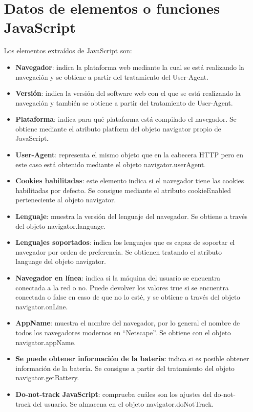 \section{Datos de elementos o funciones JavaScript}
Los elementos extraídos de JavaScript son:
\begin{itemize}
    \item \textbf{Navegador}: indica la plataforma web mediante la cual se está realizando la navegación y se obtiene a partir del tratamiento del User-Agent.
    \item \textbf{Versión}: indica la versión del software web con el que se está realizando la navegación y también se obtiene a partir del tratamiento de User-Agent.
    \item \textbf{Plataforma}: indica para qué plataforma está compilado el navegador. Se obtiene mediante el atributo platform del objeto navigator propio de JavaScript.
    \item \textbf{User-Agent}: representa el mismo objeto que en la cabecera HTTP pero en este caso está obtenido mediante el objeto navigator.userAgent.
    \item \textbf{Cookies habilitadas}: este elemento indica si el navegador tiene las cookies habilitadas por defecto. Se consigue mediante el atributo cookieEnabled perteneciente al objeto navigator.
    \item \textbf{Lenguaje}: muestra la versión del lenguaje del navegador. Se obtiene a través del objeto navigator.language. 
    \item \textbf{Lenguajes soportados}: indica los lenguajes que es capaz de soportar el navegador por orden de preferencia. Se obtienen tratando el atributo language del objeto navigator. 
    \item \textbf{Navegador en línea}: indica si la máquina del usuario se encuentra conectada a la red o no. Puede devolver los valores true si se encuentra conectada o false en caso de que no lo esté, y se obtiene a través del objeto navigator.onLine.
    \item \textbf{AppName}: muestra el nombre del navegador, por lo general el nombre de todos los navegadores modernos en “Netscape”. Se obtiene con el objeto navigator.appName.
    \item \textbf{Se puede obtener información de la batería}: indica si es posible obtener información de la batería. Se consigue a partir del tratamiento del objeto navigator.getBattery. 
    \item \textbf{Do-not-track JavaScript}: comprueba cuáles son los ajustes del do-not-track del usuario. Se almacena en el objeto navigator.doNotTrack. 

\end{itemize}
